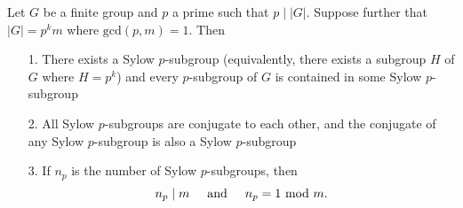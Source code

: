 \documentclass[12pt,letterpaper]{algebra_book}
\theoremstyle{definition}
\begin{document}
    \begin{thm} Let $G$ be a finite group and $p$ a
    prime such that $p \mid |G|$. Suppose further that $|G| = p^km$
    where $\mbox{gcd}(p, m) = 1$. Then 
    \begin{itemize}
        \item[1.] There exists a Sylow $p$-subgroup (equivalently, there
        exists a subgroup $H$ of $G$ where $H = p^k$) and every
        $p$-subgroup of $G$ is contained in some Sylow $p$-subgroup 

        \item[2.] All Sylow $p$-subgroups are conjugate to each other,
       and the conjugate of any Sylow $p$-subgroup is also a Sylow
       $p$-subgroup
       \item[3.] If $n_p$ is the number of Sylow $p$-subgroups, then 
       \[
           n_p \mid m \hspace{0.5cm}\text{and}\hspace{0.5cm} n_p = 1 \mbox{ mod } m.
       \] 
    \end{itemize}
    \vspace{-.4cm}
    \end{thm}
\end{document}
